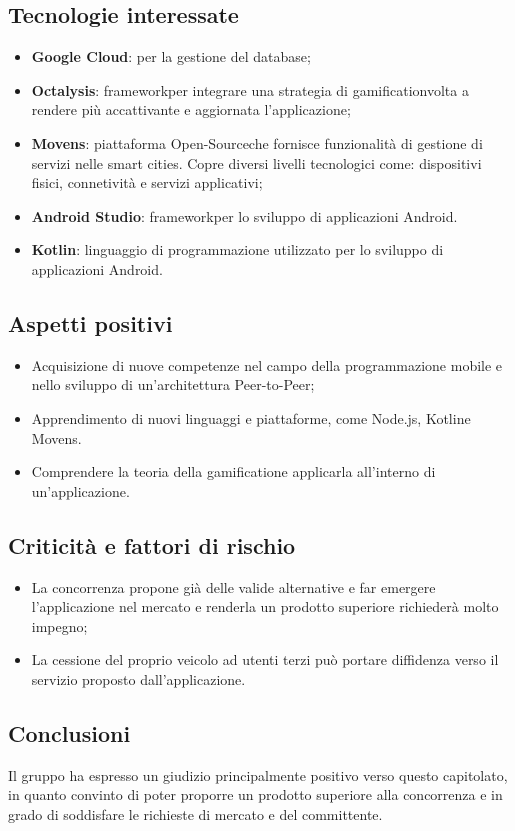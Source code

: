 \subsection{Tecnologie interessate}
\begin{itemize}	
	\item \textbf{Google Cloud}: per la gestione del database;
	\item \textbf{Octalysis\glosp}: framework\glosp per integrare una strategia di gamification\glosp volta a rendere più accattivante e aggiornata l'applicazione;
	\item \textbf{Movens\glosp}: piattaforma Open-Source\glosp che fornisce funzionalità di gestione di servizi nelle smart cities. Copre diversi livelli tecnologici come: dispositivi fisici, connetività e servizi applicativi;	
	\item \textbf{Android Studio}: framework\glosp per lo sviluppo di applicazioni Android.
	\item \textbf{Kotlin\glosp}: linguaggio di programmazione utilizzato per lo sviluppo di applicazioni Android.
\end{itemize}
\subsection{Aspetti positivi}
\begin{itemize}
	\item Acquisizione di nuove competenze nel campo della programmazione mobile e nello sviluppo di un'architettura Peer-to-Peer\glosp;
	\item Apprendimento di nuovi linguaggi e piattaforme, come Node.js\glo, Kotlin\glosp e Movens\glosp.
	\item Comprendere la teoria della gamification\glosp e applicarla all'interno di un'applicazione.
\end{itemize}
\subsection{Criticità e fattori di rischio}
\begin{itemize}
	\item La concorrenza propone già delle valide alternative e far emergere l'applicazione nel mercato e renderla un prodotto superiore richiederà molto impegno;
	\item La cessione del proprio veicolo ad utenti terzi può portare diffidenza verso il servizio proposto dall'applicazione.
\end{itemize}
\subsection{Conclusioni}
Il gruppo ha espresso un giudizio principalmente positivo verso questo capitolato\glosp,
in quanto convinto di poter proporre un prodotto superiore alla concorrenza e in grado di soddisfare le richieste di mercato e del committente.